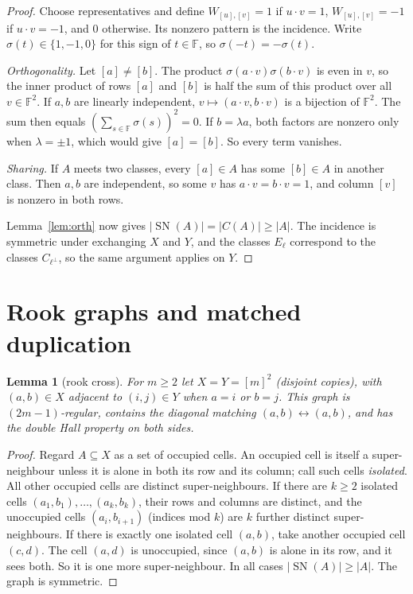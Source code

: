 \documentclass[11pt]{amsart}
\newtheorem{lemma}[theorem]{Lemma}
\theoremstyle{definition}
\theoremstyle{remark}
\newcommand{\F}{\mathbb{F}}
\newcommand{\sn}{\operatorname{SN}}
\begin{document}
\begin{proof}
Choose representatives and define $W_{[u],[v]}=1$ if $u\cdot v=1$, $W_{[u],[v]}=-1$ if
$u\cdot v=-1$, and $0$ otherwise. Its nonzero pattern is the incidence. Write
$\sigma(t)\in\{1,-1,0\}$ for this sign of $t\in\F$, so $\sigma(-t)=-\sigma(t)$.

\emph{Orthogonality.} Let $[a]\ne[b]$. The product $\sigma(a\cdot v)\sigma(b\cdot v)$ is
even in $v$, so the inner product of rows $[a]$ and $[b]$ is half the sum of this product
over all $v\in\F^2$. If $a,b$ are linearly independent, $v\mapsto(a\cdot v,b\cdot v)$ is a
bijection of $\F^2$. The sum then equals $(\sum_{s\in\F}\sigma(s))^2=0$. If $b=\lambda a$,
both factors are nonzero only when $\lambda=\pm1$, which would give $[a]=[b]$. So every
term vanishes.

\emph{Sharing.} If $A$ meets two classes, every $[a]\in A$ has some $[b]\in A$ in another
class. Then $a,b$ are independent, so some $v$ has $a\cdot v=b\cdot v=1$, and column $[v]$
is nonzero in both rows.

Lemma~\ref{lem:orth} now gives $|\sn(A)|=|C(A)|\ge|A|$. The incidence is symmetric under
exchanging $X$ and $Y$, and the classes $E_\ell$ correspond to the classes
$C_{\ell^\perp}$, so the same argument applies on $Y$.
\end{proof}

\section{Rook graphs and matched duplication}\label{sec:rook}

\begin{lemma}[rook cross]\label{lem:rook}
For $m\ge2$ let $X=Y=[m]^2$ (disjoint copies), with $(a,b)\in X$ adjacent to $(i,j)\in Y$
when $a=i$ or $b=j$. This graph is $(2m-1)$-regular, contains the diagonal matching
$(a,b)\leftrightarrow(a,b)$, and has the double Hall property on both sides.
\end{lemma}

\begin{proof}
Regard $A\subseteq X$ as a set of occupied cells. An occupied cell is itself a
super-neighbour unless it is alone in both its row and its column; call such cells
\emph{isolated}. All other occupied cells are distinct super-neighbours. If there are $k\ge2$
isolated cells $(a_1,b_1),\dots,(a_k,b_k)$, their rows and columns are distinct, and the
unoccupied cells $(a_i,b_{i+1})$ (indices mod $k$) are $k$ further distinct
super-neighbours. If there is exactly one isolated cell $(a,b)$, take another occupied cell
$(c,d)$. The cell $(a,d)$ is unoccupied, since $(a,b)$ is alone in its row, and it sees both.
So it is one more super-neighbour. In all cases $|\sn(A)|\ge|A|$. The graph is symmetric.
\end{proof}
\end{document}
